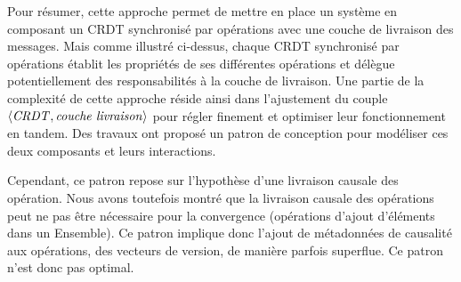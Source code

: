 Pour résumer, cette approche permet de mettre en place un système en composant un \ac{CRDT} synchronisé par opérations avec une couche de livraison des messages.
Mais comme illustré ci-dessus, chaque \ac{CRDT} synchronisé par opérations établit les propriétés de ses différentes opérations et délègue potentiellement des responsabilités à la couche de livraison.
Une partie de la complexité de cette approche réside ainsi dans l'ajustement du couple $\langle \mathit{CRDT}, \mathit{couche~livraison} \rangle$ pour régler finement et optimiser leur fonctionnement en tandem.
Des travaux \cite{baquero2017pure, 2021-improving-reactivity-pure-op-based-crdts-bauwens} ont proposé un patron de conception pour modéliser ces deux composants et leurs interactions.

Cependant, ce patron repose sur l'hypothèse d'une livraison causale des opération.
Nous avons toutefois montré que la livraison causale des opérations peut ne pas être nécessaire pour la convergence (\eg opérations d'ajout d'éléments dans un Ensemble).
Ce patron implique donc l'ajout de métadonnées de causalité aux opérations, \ie des vecteurs de version, de manière parfois superflue.
Ce patron n'est donc pas optimal.
